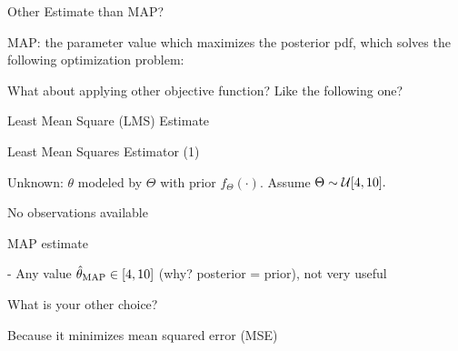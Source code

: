 \begin{frame}{Other Estimate than MAP?}
  
  \plitemsep 0.2in
  \bci
  
\item<2-> MAP: the parameter value which maximizes the posterior pdf,
  which solves the following optimization problem:
  
\item<3->  What about applying other objective function? Like the
  following one?


  \item<5-> Least Mean Square (LMS) Estimate 
  \eci

\end{frame}




\begin{frame}{Least Mean Squares Estimator (1)}

\plitemsep 0.05in
\bci

\item<1-> Unknown: $\theta$ modeled by $\Theta$ with prior
  $f_{\Theta}(\cdot).$ Assume $\Theta \sim  \mathcal U[4,10].$

\item<2-> No observations available

\item<3-> MAP estimate

  - Any value $\hat{\theta}_{\text{MAP}} \in [4,10]$ (why? posterior = prior), not very useful

\item<4-> What is your other choice?


\item<6-> Because it minimizes mean squared error (MSE)
\small
{}


\eci

\end{frame}

